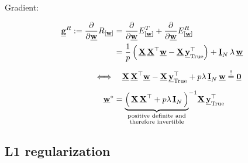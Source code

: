 \begin{frame}

Gradient:

\begin{align}
\vec g^R :=  \frac{\partial}{\partial \vec w} R_{[\vec w]}
&= \frac{\partial}{\partial \vec w} E^T_{[\vec w]} + \frac{\partial}{\partial \vec w} E^R_{[\vec w]}\\
&= \frac{1}{p} \left(\, \vec X \, \vec X^\top \vec w - \vec X\, \vec y_{\text{True}}^\top \right) + \vec I_N \, \lambda \, \vec w\\[2mm]
\iff& \quad \vec X \, \vec X^\top \vec w - \vec X\, \vec y_{\text{True}}^\top + p \lambda \, \vec I_N \,  \vec w \eqexcl \vec 0\\[2mm]
\vec w^* &=  {\underbrace{
\left(\, \vec X \, \vec X^\top + p \lambda \, \vec I_N \,  \right)
}_{
\substack{
\text{positive definite and}\\
\text{therefore invertible}\\
}
}
}^{-1} \vec X \, \vec y_{\mathrm{True}}^{\top}
\end{align}

\end{frame}

\subsection{L1 regularization}

